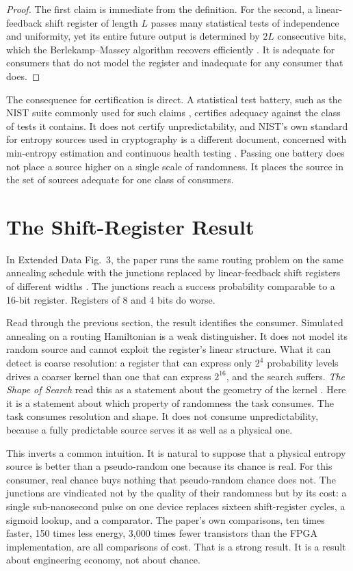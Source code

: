 \documentclass[11pt]{article}
\theoremstyle{definition}
\theoremstyle{remark}
\begin{document}
\begin{proof}
The first claim is immediate from the definition. For the second, a linear-feedback shift register of length $L$ passes many statistical tests of independence and uniformity, yet its entire future output is determined by $2L$ consecutive bits, which the Berlekamp--Massey algorithm recovers efficiently \cite{massey1969}. It is adequate for consumers that do not model the register and inadequate for any consumer that does.
\end{proof}

The consequence for certification is direct. A statistical test battery, such as the NIST suite commonly used for such claims \cite{nist80022}, certifies adequacy against the class of tests it contains. It does not certify unpredictability, and NIST's own standard for entropy sources used in cryptography is a different document, concerned with min-entropy estimation and continuous health testing \cite{nist80090b}. Passing one battery does not place a source higher on a single scale of randomness. It places the source in the set of sources adequate for one class of consumers.

\section{The Shift-Register Result}

In Extended Data Fig.~3, the paper runs the same routing problem on the same annealing schedule with the junctions replaced by linear-feedback shift registers of different widths \cite{li2026}. The junctions reach a success probability comparable to a 16-bit register. Registers of 8 and 4 bits do worse.

Read through the previous section, the result identifies the consumer. Simulated annealing on a routing Hamiltonian is a weak distinguisher. It does not model its random source and cannot exploit the register's linear structure. What it can detect is coarse resolution: a register that can express only $2^4$ probability levels drives a coarser kernel than one that can express $2^{16}$, and the search suffers. \emph{The Shape of Search} read this as a statement about the geometry of the kernel \cite{flyxion-shape}. Here it is a statement about which property of randomness the task consumes. The task consumes resolution and shape. It does not consume unpredictability, because a fully predictable source serves it as well as a physical one.

This inverts a common intuition. It is natural to suppose that a physical entropy source is better than a pseudo-random one because its chance is real. For this consumer, real chance buys nothing that pseudo-random chance does not. The junctions are vindicated not by the quality of their randomness but by its cost: a single sub-nanosecond pulse on one device replaces sixteen shift-register cycles, a sigmoid lookup, and a comparator. The paper's own comparisons, ten times faster, 150 times less energy, 3,000 times fewer transistors than the FPGA implementation, are all comparisons of cost. That is a strong result. It is a result about engineering economy, not about chance.
\end{document}
